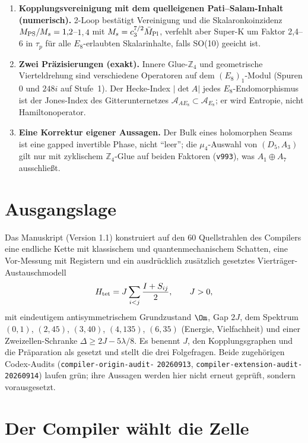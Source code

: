 \begin{enumerate}[leftmargin=*]
\item \textbf{Kopplungsvereinigung mit dem quelleigenen Pati--Salam-Inhalt (numerisch).} 2-Loop bestätigt Vereinigung und die Skalaronkoinzidenz $M_{\rm PS}/M_s=1{,}2$--$1{,}4$ mit $M_s=c_3^{7/2}\bar M_{\rm Pl}$, verfehlt aber Super-K um Faktor 2{,}4--6 in $\tau_p$ für alle $E_8$-erlaubten Skalarinhalte, falls SO(10) geeicht ist.
\item \textbf{Zwei Präzisierungen (exakt).} Innere Glue-$\mathbb Z_4$ und geometrische Vierteldrehung sind verschiedene Operatoren auf dem $(E_8)_1$-Modul (Spuren $0$ und $248i$ auf Stufe~1). Der Hecke-Index $|\det A|$ jedes $E_8$-Endomorphismus ist der Jones-Index des Gitterunternetzes $\mathcal A_{AE_8}\subset\mathcal A_{E_8}$; er wird Entropie, nicht Hamiltonoperator.
\item \textbf{Eine Korrektur eigener Aussagen.} Der Bulk eines holomorphen Seams ist eine gapped invertible Phase, nicht \enquote{leer}; die $\mu_4$-Auswahl von $(D_5,A_3)$ gilt nur mit zyklischem $\mathbb Z_4$-Glue auf beiden Faktoren (\texttt{v993}), was $A_1\oplus A_7$ ausschließt.
\end{enumerate}

\section{Ausgangslage}
Das Manuskript (Version 1.1) konstruiert auf den 60 Quellstrahlen des Compilers eine endliche Kette mit klassischem und quantenmechanischem Schatten, eine Vor-Messung mit Registern und ein ausdrücklich zusätzlich gesetztes Vierträger-Austauschmodell
\[
H_{\rm tet}=J\sum_{i<j}\frac{I+S_{ij}}{2},\qquad J>0,
\]
mit eindeutigem antisymmetrischem Grundzustand $\Om$, Gap $2J$, dem Spektrum $(0,1)$, $(2,45)$, $(3,40)$, $(4,135)$, $(6,35)$ (Energie, Vielfachheit) und einer Zweizellen-Schranke $\Delta\ge2J-5\lambda/8$. Es benennt $J$, den Kopplungsgraphen und die Präparation als gesetzt und stellt die drei Folgefragen. Beide zugehörigen Codex-Audits (\texttt{compiler-origin-audit-} \texttt{20260913}, \texttt{compiler-extension-audit-} \texttt{20260914}) laufen grün; ihre Aussagen werden hier nicht erneut geprüft, sondern vorausgesetzt.

\section{Der Compiler wählt die Zelle}

